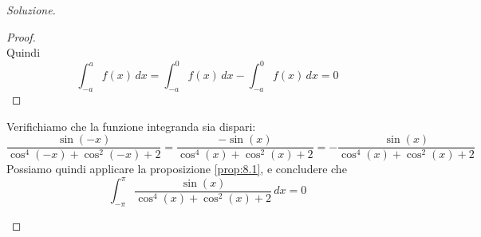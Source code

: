 \begin{proof}[Soluzione]
\begin{enumerate}[(i)]
\begin{tcolorbox}
\begin{proof}
\[                \]
                Quindi
                \[
                \int_{-a}^a f(x)\, dx = \int_{-a}^0 f(x)\, dx - \int_{-a}^0 f(x)\, dx = 0
                \]
            \end{proof}
        \end{tcolorbox}
        Verifichiamo che la funzione integranda sia dispari:
        \[
        \frac{\sin(-x)}{\cos^4(-x)+\cos^2(-x)+2} = \frac{-\sin(x)}{\cos^4(x)+\cos^2(x)+2} = -\frac{\sin(x)}{\cos^4(x)+\cos^2(x)+2}
        \]
        Possiamo quindi applicare la proposizione \ref{prop:8.1}, e concludere che
        \[
        \int_{-\pi}^\pi  \frac{\sin(x)}{\cos^4(x)+\cos^2(x)+2}\, dx =0
        \]
    \end{enumerate}
\end{proof}
\newpage